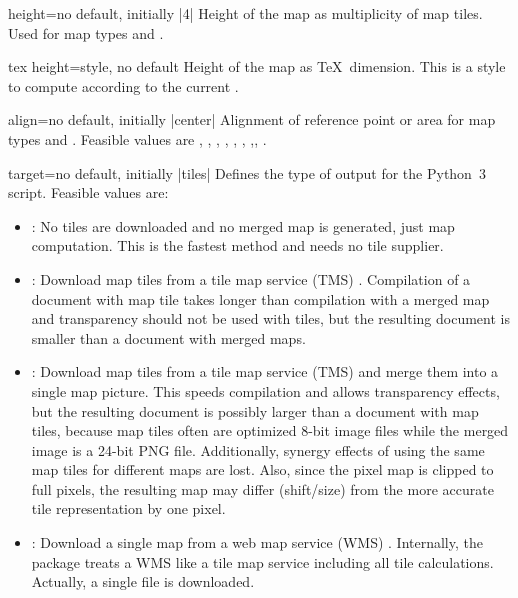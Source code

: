 \begin{docMrcKey}[supply]{height}{=}{no default, initially |4|}
  Height of the map as multiplicity of map tiles.
  Used for map types  and .
\end{docMrcKey}

\begin{docMrcKey}[supply]{tex height}{=}{style, no default}
  Height of the map as \TeX\ dimension.
  This is a style to compute  according to
  the current .
\end{docMrcKey}

\begin{docMrcKey}[supply]{align}{=}{no default, initially |center|}
  Alignment of reference point or area for map types  and .
  Feasible values are
  , , , ,
  , , ,, .
\end{docMrcKey}

\begin{docMrcKey}[supply]{target}{=}{no default, initially |tiles|}
  Defines the type of output for the Python~3 script. Feasible values are:
  \begin{itemize}
  \item{}: No tiles are downloaded and no merged map is generated, just map computation.
    This is the fastest method and needs no tile supplier.
  \item{}: Download map tiles from a tile map service (TMS) .
    Compilation of a document with map tile takes longer than compilation
    with a merged map and transparency should not be used with tiles,
    but the resulting document is smaller than a document with merged maps.
  \item{}: Download map tiles from a tile map service (TMS)
     and merge them into a single map picture.
    This speeds compilation and allows transparency effects, but
    the resulting document is possibly larger than a document with map tiles,
    because map tiles often are optimized 8-bit image files while the merged
    image is a 24-bit PNG file. Additionally, synergy effects of using the same map tiles
    for different maps are lost.
    Also, since the pixel map is clipped to full pixels, the resulting map
    may differ (shift/size) from the more accurate tile representation by
    one pixel.
  \item{}: Download a single map from a web map service (WMS)
    . Internally, the package treats a WMS like
    a tile map service including all tile calculations. Actually, a single
    file is downloaded.
  \end{itemize}
\end{docMrcKey}


